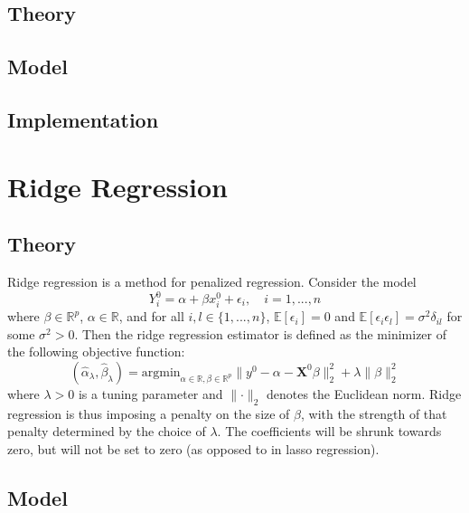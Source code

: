 \documentclass[
]{article}
\begin{document}
\hypertarget{theory}{%
\subsection{Theory}\label{theory}}

\hypertarget{model}{%
\subsection{Model}\label{model}}

\hypertarget{implementation}{%
\subsection{Implementation}\label{implementation}}

\hypertarget{ridge-regression}{%
\section{Ridge Regression}\label{ridge-regression}}

\hypertarget{theory-1}{%
\subsection{Theory}\label{theory-1}}

Ridge regression is a method for penalized regression. Consider the
model \[Y_i^0 = \alpha + \beta x_i^0 + \epsilon_i, \quad  i = 1,..., n\]
where \(\beta \in \mathbb{R}^p\), \(\alpha \in \mathbb{R}\), and for all
\(i, l \in \{1, ..., n\}\), \(\mathbb{E}[\epsilon_i] = 0\) and
\(\mathbb{E}[\epsilon_i \epsilon_l] = \sigma^2 \delta_{il}\) for some
\(\sigma^2 > 0\). Then the ridge regression estimator is defined as the
minimizer of the following objective function:
\[(\hat{\alpha}_\lambda, \hat{\beta}_\lambda) = \mathrm{argmin}_{\alpha \in \mathbb{R}, \beta \in \mathbb{R}^p} \lVert y^0 - \alpha - \boldsymbol{X}^0 \beta \rVert^2_2 + \lambda \lVert \beta \rVert^2_2\]
where \(\lambda > 0\) is a tuning parameter and
\(\lVert \cdot \rVert_2\) denotes the Euclidean norm. Ridge regression
is thus imposing a penalty on the size of \(\beta\), with the strength
of that penalty determined by the choice of \(\lambda\). The
coefficients will be shrunk towards zero, but will not be set to zero
(as opposed to in lasso regression).

\hypertarget{model-1}{%
\subsection{Model}\label{model-1}}
\end{document}
